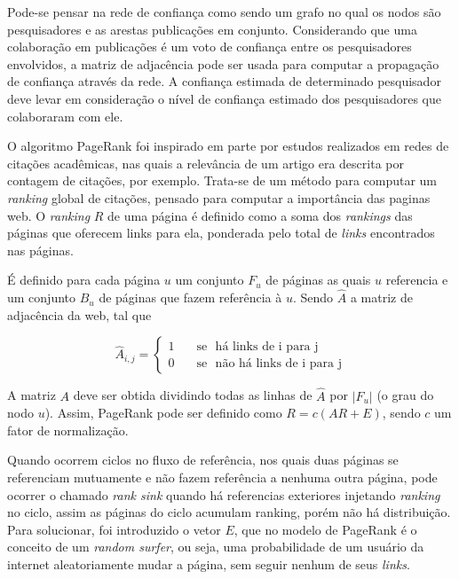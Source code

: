 \documentclass[12pt]{article}
\begin{document}
Pode-se pensar na rede de confiança como sendo um grafo no qual os nodos são pesquisadores e as arestas publicações em conjunto.
Considerando que uma colaboração em publicações é um voto de confiança entre os pesquisadores envolvidos, a matriz de adjacência 
pode ser usada para computar a propagação de confiança através da rede. A confiança estimada de determinado pesquisador deve levar 
em consideração o nível de confiança estimado dos pesquisadores que colaboraram com ele.

O algoritmo PageRank \cite{page1999pagerank} foi inspirado em parte por estudos realizados em redes de citações acadêmicas, nas 
quais a relevância de um artigo era descrita por contagem de citações, por exemplo. Trata-se de um método para computar um \textit{ran\-king} 
global de citações, pensado para computar a importância das paginas web. O \textit{ranking} $R$ de uma página é definido como a soma dos 
\textit{rankings} das páginas que oferecem links para ela, ponderada pelo total de \textit{links} encontrados nas páginas.

É definido para cada página $u$ um conjunto $F_u$ de páginas as quais $u$ referencia e um conjunto $B_u$ de páginas que fazem 
referência à $u$. Sendo $\hat{A}$ a matriz de adjacência da web, tal que 

\begin{equation} \label{eqn:adjacency-matrix}
   \hat{A}_{i,j} =
    \begin{cases}
      1       & \quad \text{se } \text{ há links de i para j}\\
      0       & \quad \text{se } \text{ não há links de i para j}
    \end{cases}
\end{equation}

A matriz $A$ deve ser obtida dividindo todas as linhas de $\hat{A}$ por $|F_u|$ (o grau do nodo $u$). Assim, PageRank pode ser definido 
como $R = c(AR + E)$, sendo $c$ um fator de normalização.

Quando ocorrem ciclos no fluxo de referência, nos quais duas páginas se referenciam mutuamente e não fazem referência a nenhuma 
outra página, pode ocorrer o chamado \textit{rank sink} quando há referencias exteriores injetando \textit{ranking} no ciclo, 
assim as páginas do ciclo acumulam ranking, porém não há distribuição. Para solucionar, foi introduzido o vetor $E$, que no modelo 
de PageRank é o conceito de um \textit{random surfer}, ou seja, uma probabilidade de um usuário da internet aleatoriamente mudar a 
página, sem seguir nenhum de seus \textit{links}. \cite{page1999pagerank}
\end{document}
